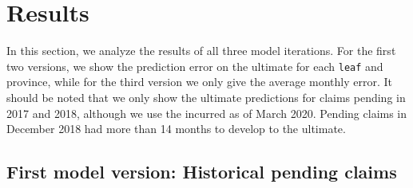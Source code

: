 \section{Results}\label{Sect_Results}
In this section, we analyze the results of all three model iterations. For the first two versions, we show the prediction error on the ultimate for each \texttt{leaf} and province, while for the third version we only give the average monthly error. It should be noted that we only show the ultimate predictions for claims pending in 2017 and 2018, although we use the incurred as of March 2020. Pending claims in December 2018 had more than 14 months to develop to the ultimate. 
\subsection{First model version: Historical pending claims}
